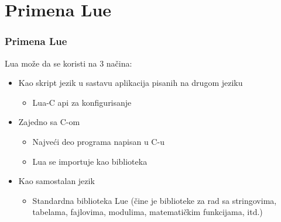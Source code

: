 \documentclass{beamer}
\begin{document}


\section{Primena Lue}
\begin{frame}
\frametitle{Primena Lue}

Lua može da se koristi na 3 načina:

\begin{itemize}

\item Kao skript jezik u sastavu aplikacija pisanih na drugom jeziku
\begin{itemize}
\item Lua-C api za konfigurisanje
\end{itemize}

\item Zajedno sa C-om
\begin{itemize}
\item Najveći deo programa napisan u C-u
\item Lua se importuje kao biblioteka
\end{itemize}

\item Kao samostalan jezik  
\begin{itemize}
\item Standardna biblioteka Lue (čine je biblioteke za rad sa stringovima, tabelama, fajlovima, modulima, matematičkim funkcijama, itd.)
\end{itemize}
 
\end{itemize}

\end{frame}

\end{document}
